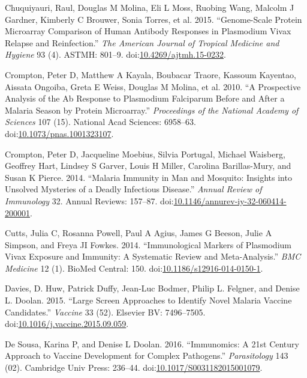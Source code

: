 \documentclass[a4paper]{article}
\begin{document}
\hypertarget{ref-chuquiyauri2015vivax}{}
Chuquiyauri, Raul, Douglas M Molina, Eli L Moss, Ruobing Wang, Malcolm J
Gardner, Kimberly C Brouwer, Sonia Torres, et al. 2015. ``Genome-Scale
Protein Microarray Comparison of Human Antibody Responses in Plasmodium
Vivax Relapse and Reinfection.'' \emph{The American Journal of Tropical
Medicine and Hygiene} 93 (4). ASTMH: 801--9.
doi:\href{https://doi.org/10.4269/ajtmh.15-0232}{10.4269/ajtmh.15-0232}.

\hypertarget{ref-crompton2010}{}
Crompton, Peter D, Matthew A Kayala, Boubacar Traore, Kassoum Kayentao,
Aissata Ongoiba, Greta E Weiss, Douglas M Molina, et al. 2010. ``A
Prospective Analysis of the Ab Response to Plasmodium Falciparum Before
and After a Malaria Season by Protein Microarray.'' \emph{Proceedings of
the National Academy of Sciences} 107 (15). National Acad Sciences:
6958--63.
doi:\href{https://doi.org/10.1073/pnas.1001323107}{10.1073/pnas.1001323107}.

\hypertarget{ref-crompton2014rev}{}
Crompton, Peter D, Jacqueline Moebius, Silvia Portugal, Michael
Waisberg, Geoffrey Hart, Lindsey S Garver, Louis H Miller, Carolina
Barillas-Mury, and Susan K Pierce. 2014. ``Malaria Immunity in Man and
Mosquito: Insights into Unsolved Mysteries of a Deadly Infectious
Disease.'' \emph{Annual Review of Immunology} 32. Annual Reviews:
157--87.
doi:\href{https://doi.org/10.1146/annurev-iy-32-060414-200001}{10.1146/annurev-iy-32-060414-200001}.

\hypertarget{ref-cutts2014meta}{}
Cutts, Julia C, Rosanna Powell, Paul A Agius, James G Beeson, Julie A
Simpson, and Freya JI Fowkes. 2014. ``Immunological Markers of
Plasmodium Vivax Exposure and Immunity: A Systematic Review and
Meta-Analysis.'' \emph{BMC Medicine} 12 (1). BioMed Central: 150.
doi:\href{https://doi.org/10.1186/s12916-014-0150-1}{10.1186/s12916-014-0150-1}.

\hypertarget{ref-Davies2015Large}{}
Davies, D. Huw, Patrick Duffy, Jean-Luc Bodmer, Philip L. Felgner, and
Denise L. Doolan. 2015. ``Large Screen Approaches to Identify Novel
Malaria Vaccine Candidates.'' \emph{Vaccine} 33 (52). Elsevier BV:
7496--7505.
doi:\href{https://doi.org/10.1016/j.vaccine.2015.09.059}{10.1016/j.vaccine.2015.09.059}.

\hypertarget{ref-immunomics2016}{}
De Sousa, Karina P, and Denise L Doolan. 2016. ``Immunomics: A 21st
Century Approach to Vaccine Development for Complex Pathogens.''
\emph{Parasitology} 143 (02). Cambridge Univ Press: 236--44.
doi:\href{https://doi.org/10.1017/S0031182015001079}{10.1017/S0031182015001079}.
\end{document}
